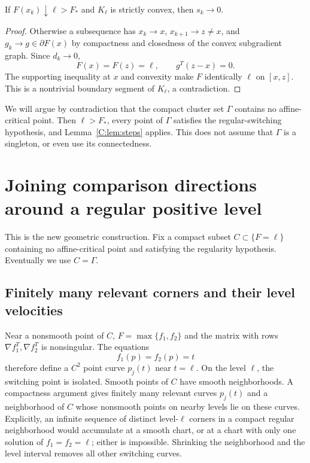 \begin{lemma}\label{C:lem:steps}
If $F(x_k)\downarrow\ell>F_*$ and $K_\ell$ is strictly convex, then $s_k\to0$.
\end{lemma}
\begin{proof}
Otherwise a subsequence has $x_k\to x$, $x_{k+1}\to z\ne x$, and $g_k\to g\in\partial F(x)$ by compactness and closedness of the convex subgradient graph. Since $d_k\to0$,
\[
 F(x)=F(z)=\ell,\qquad g^T(z-x)=0.
\]
The supporting inequality at $x$ and convexity make $F$ identically $\ell$ on $[x,z]$. This is a nontrivial boundary segment of $K_\ell$, a contradiction.
\end{proof}

We will argue by contradiction that the compact cluster set $\Gamma$ contains no affine-critical point. Then $\ell>F_*$, every point of $\Gamma$ satisfies the regular-switching hypothesis, and Lemma~\ref{C:lem:steps} applies. This does not assume that $\Gamma$ is a singleton, or even use its connectedness.


\setcounter{section}{3}
\setcounter{theorem}{4}
\setcounter{equation}{5}
\section{Joining comparison directions around a regular positive level}
This is the new geometric construction. Fix a compact subset $C\subset\{F=\ell\}$ containing no affine-critical point and satisfying the regularity hypothesis. Eventually we use $C=\Gamma$.

\subsection{Finitely many relevant corners and their level velocities}
Near a nonsmooth point of $C$, $F=\max\{f_1,f_2\}$ and the matrix with rows $\nabla f_1^T,\nabla f_2^T$ is nonsingular. The equations
\[
 f_1(p)=f_2(p)=t
\]
therefore define a $C^2$ point curve $p_j(t)$ near $t=\ell$. On the level $\ell$, the switching point is isolated. Smooth points of $C$ have smooth neighborhoods. A compactness argument gives finitely many relevant curves $p_j(t)$ and a neighborhood of $C$ whose nonsmooth points on nearby levels lie on these curves. Explicitly, an infinite sequence of distinct level-$\ell$ corners in a compact regular neighborhood would accumulate at a smooth chart, or at a chart with only one solution of $f_1=f_2=\ell$; either is impossible. Shrinking the neighborhood and the level interval removes all other switching curves.

